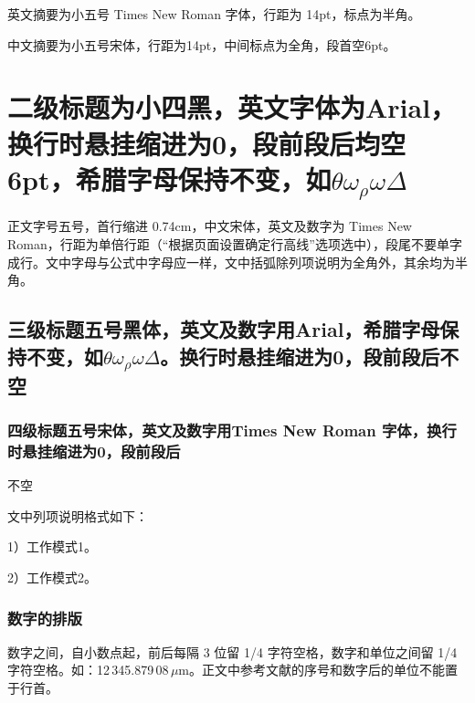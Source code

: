\documentclass[UTF8,twoside,a4paper,fontset=none]{ctexart}
\begin{document}

\begin{cseeabstractEN}
英文摘要为小五号 Times New Roman 字体，行距为 14pt，标点为半角。
\end{cseeabstractEN}

\begin{cseeabstract}
中文摘要为小五号宋体，行距为14pt，中间标点为全角，段首空6pt。
\end{cseeabstract}

\section{二级标题为小四黑，英文字体为Arial，换行时悬挂缩进为0，段前段后均空6pt，希腊字母保持不变，如$\theta\omega_{\rho}\omega\Delta$}
正文字号五号，首行缩进 0.74cm，中文宋体，英文及数字为 Times New Roman，行距为单倍行距（“根据页面设置确定行高线”选项选中），段尾不要单字成行。文中字母与公式中字母应一样，文中括弧除列项说明为全角外，其余均为半角。

\subsection{三级标题五号黑体，英文及数字用Arial，希腊字母保持不变，如$\theta\omega_{\rho}\omega\Delta$。换行时悬挂缩进为0，段前段后不空}
\subsubsection{四级标题五号宋体，英文及数字用Times New Roman 字体，换行时悬挂缩进为0，段前段后}
\newpage
\noindent 不空\par

文中列项说明格式如下：

1）工作模式1。

2）工作模式2。

\subsubsection{数字的排版}
数字之间，自小数点起，前后每隔 3 位留 1/4 字符空格，数字和单位之间留 1/4 字符空格。如：12\,345.879\,08\,$\mu$m。正文中参考文献的序号和数字后的单位不能置于行首。
\end{document}
